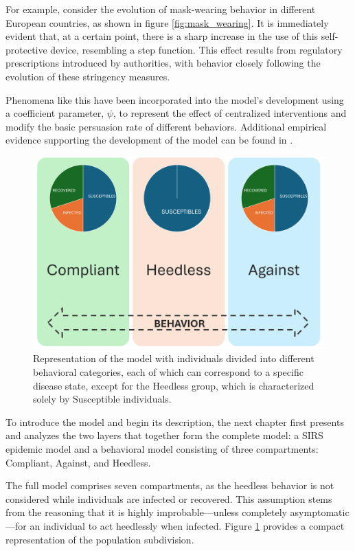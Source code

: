 For example, consider the evolution of mask-wearing behavior in different European countries, as shown in figure \ref{fig:mask_wearing}. It is immediately evident that, at a certain point, there is a sharp increase in the use of this self-protective device, resembling a step function. This effect results from regulatory prescriptions introduced by authorities, with behavior closely following the evolution of these stringency measures.

Phenomena like this have been incorporated into the model's development using a coefficient parameter, $\psi$, to represent the effect of centralized interventions and modify the basic persuasion rate of different behaviors. Additional empirical evidence supporting the development of the model can be found in \cite{Proverbio_Tex_2024}. 

\begin{figure}[h]
	\centering
	\includegraphics[width=0.6\linewidth]{1_corpo/figure/Model_behav_epidemic}
	\caption[Epi-behavior model]{Representation of the model with individuals divided into different behavioral categories, each of which can correspond to a specific disease state, except for the Heedless group, which is characterized solely by Susceptible individuals.}
	\label{fig:modelbehavepidemic}
\end{figure}

To introduce the model and begin its description, the next chapter first presents and analyzes the two layers that together form the complete model: a SIRS epidemic model and a behavioral model consisting of three compartments: Compliant, Against, and Heedless.

The full model comprises seven compartments, as the heedless behavior is not considered while individuals are infected or recovered. This assumption stems from the reasoning that it is highly improbable—unless completely asymptomatic—for an individual to act heedlessly when infected. Figure \ref{fig:modelbehavepidemic} provides a compact representation of the population subdivision.


